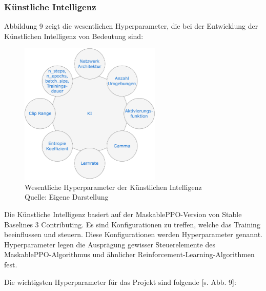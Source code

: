 \subsubsection{Künstliche Intelligenz}
Abbildung 9 zeigt die wesentlichen Hyperparameter, die bei der Entwicklung der Künstlichen Intelligenz von Bedeutung sind:
\nopagebreak
\begin{figure}[H]
	\centering
	\includegraphics[width=0.6\textwidth]{Bilder/KI} 
	\caption[Wesentliche Hyperparameter der Künstlichen Intelligenz]{Wesentliche Hyperparameter der Künstlichen Intelligenz\\ Quelle: Eigene Darstellung}
\end{figure}

Die Künstliche Intelligenz basiert auf der MaskablePPO-Version von Stable Baselines 3 Contributing. Es sind Konfigurationen zu treffen, welche das Training beeinflussen und steuern. Diese Konfigurationen werden Hyperparameter genannt. Hyperparameter legen die Ausprägung gewisser Steuerelemente des MaskablePPO-Algorithmus und ähnlicher Reinforcement-Learning-Algorithmen fest.

Die wichtigsten Hyperparameter für das Projekt sind folgende [s. Abb. 9]:

